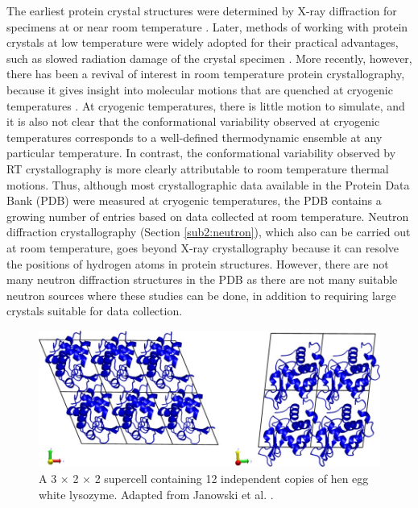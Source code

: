 \documentclass[9pt,review]{livecoms}
\begin{document}
The earliest protein crystal structures were determined by X-ray diffraction for specimens at or near room temperature \cite{muirhead_structure_1963}.
Later, methods of working with protein crystals at low temperature were widely adopted for their practical advantages, such as slowed radiation damage of the crystal specimen \cite{fischer_macromolecular_2021,thorne_determining_2023}.
More recently, however, there has been a revival of interest in room temperature protein crystallography, because it gives insight into molecular motions that are quenched at cryogenic temperatures \cite{fraser_hidden_2009,keedy_crystal_2014,fischer_macromolecular_2021,thorne_determining_2023}.
At cryogenic temperatures, there is little motion to simulate, and it is also not clear that the conformational variability observed at cryogenic temperatures corresponds to a well-defined thermodynamic ensemble at any particular temperature.
In contrast, the conformational variability observed by RT crystallography is more clearly attributable to room temperature thermal motions.
Thus, although most crystallographic data available in the Protein Data Bank (PDB) were measured at cryogenic temperatures, the PDB contains a growing number of entries based on data collected at room temperature.
Neutron diffraction crystallography (Section \ref{sub2:neutron}), which also can be carried out at room temperature, goes beyond X-ray crystallography because it can resolve the positions of hydrogen atoms in protein structures.
However, there are not many neutron diffraction structures in the PDB as there are not many suitable neutron sources where these studies can be done, in addition to requiring large crystals suitable for data collection.

\begin{figure}[t]
    \centering
    \label{fig:supercell}
    \includegraphics[width=\linewidth]{paper/figures/janowski-2016-fig-1.jpg}
    \caption{A 3 $\times$ 2 $\times$ 2 supercell containing 12 independent copies of hen egg white lysozyme.
    Adapted from Janowski et al. \cite{janowski_molecular_2016}.}
\end{figure}
\end{document}

